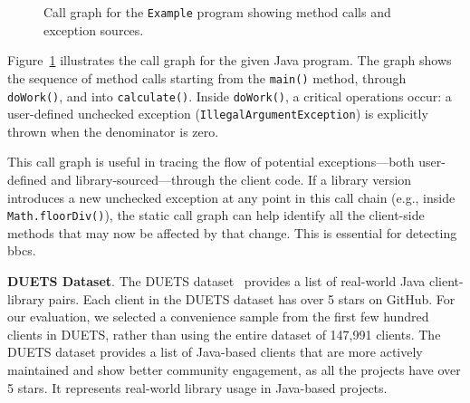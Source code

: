 \begin{figure}[h]
\centering
{}
\caption{Call graph for the \texttt{Example} program showing method calls and exception sources.}
\label{fig:callgraph-example}
\end{figure}

Figure~\ref{fig:callgraph-example} illustrates the call graph for the given Java program. The graph shows the sequence of method calls starting from the \texttt{main()} method, through \texttt{doWork()}, and into \texttt{calculate()}. Inside \texttt{doWork()}, a critical operations occur: a user-defined unchecked exception (\texttt{IllegalArgumentException}) is explicitly thrown when the denominator is zero.

This call graph is useful in tracing the flow of potential exceptions—both user-defined and library-sourced—through the client code. If a library version introduces a new unchecked exception at any point in this call chain (e.g., inside \texttt{Math.floorDiv()}), the static call graph can help identify all the client-side methods that may now be affected by that change. This is essential for detecting \glspl{bbc}.

\textbf{DUETS Dataset}. The DUETS dataset~\cite{durieux21:_duets} provides a list of real-world Java
client-library pairs. Each client in the DUETS dataset has over 5 stars on GitHub. For our evaluation,
we selected a convenience sample from the first few hundred clients in DUETS, rather than using the
entire dataset of 147,991 clients. The DUETS dataset provides a list of Java-based clients that are
more actively maintained and show better community engagement, as all the projects have over 5 stars.
It represents real-world library usage in Java-based projects.

